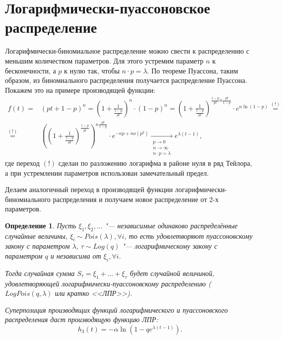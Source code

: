 \documentclass[12pt, specialist, subf, substylefile = spbu.rtx]{disser}
\newtheorem{define}{Определение}
\begin{document}
	\section{Логарифмически-пуассоновское распределение}
	
	Логарифмически-биномиальное распределение можно свести к распределению с меньшим количеством параметров. Для этого устремим параметр $n$ к бесконечности, а $p$ к нулю так, чтобы $n \cdot p = \lambda$. По теореме Пуассона, таким образом, из биномиального распределения получается распределение Пуассона. Покажем это на примере производящей функции: 
	\[
		\begin{aligned}
			f (t) =& (p t + 1 - p) ^n = \left(1 + \frac {1}{\frac{1 - p} {pt}}\right) ^n \cdot (1 - p) ^n = \left(1 + \frac {1}{\frac{1 - p} {pt}}\right) ^{\frac{1 - p} {pt} n \frac {pt} {1 - p}} \cdot e ^{n \ln(1 - p)} \stackrel{(!)}{=}\\
			\stackrel{(!)}{=}& \left(\left(1 + \frac {1}{\frac{1 - p} {pt}}\right) ^{\frac{1 - p} {pt}}\right) ^ {n \frac {pt} {1 - p}} \cdot e ^{-np + no(p ^2)} \xrightarrow[\substack{p \to 0\\n \to \infty\\n \cdot p = \lambda}]{} e ^{\lambda (t - 1)},
		\end{aligned}
	\]
	где переход $(!)$ сделан по разложению логарифма в районе нуля в ряд Тейлора, а при устремлении параметров использован замечательный предел.
	
	Делаем аналогичный переход в производящей функции логарифмически-биномиального распределения и получаем новое распределение от $2$-х параметров.
	
	\begin{define}
		Пусть $\xi _1, \xi _2, \dots$ "--- независимые одинаково распределённые случайные величины, $\xi _i \sim Pois(\lambda), \forall i$, то есть удовлетворяют пуассоновскому закону с параметром $\lambda$, $\tau \sim Log(q)$ "--- логарифмическому закону с параметром $q$ и независима от $\xi _i, \forall i$.
		
		Тогда случайная сумма $S _\tau = \xi _1 + \dots + \xi _\tau$ будет случайной величиной, удовлетворяющей логарифмически-пуассоновскому распределению ($LogPois(q, \lambda)$ или кратко <<ЛПР>>).
		
		Суперпозиция производящих функций логарифмического и пуассоновского распределения даст производящую функцию ЛПР:
		\[
			h _3 (t) = -\alpha \ln (1 - q e ^{\lambda (t - 1)}).
		\]
		\label{def:LPR}
	\end{define}
\end{document}
